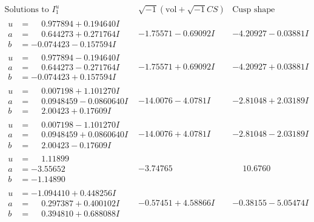 \documentclass[1p]{elsarticle_modified}
\theoremstyle{definition}
\newcommand{\I}{\sqrt{-1}}
\begin{document}
$$\begin{array}{c|c|c}  
\text{Solutions to }I^u_{1}& \I (\text{vol} + \sqrt{-1}CS) & \text{Cusp shape}\\
 \hline 
\begin{aligned}
u &= \phantom{-}0.977894 + 0.194640 I \\
a &= \phantom{-}0.644273 + 0.271764 I \\
b &= -0.074423 - 0.157594 I\end{aligned}
 & -1.75571 - 0.69092 I & -4.20927 - 0.03881 I \\ \hline\begin{aligned}
u &= \phantom{-}0.977894 - 0.194640 I \\
a &= \phantom{-}0.644273 - 0.271764 I \\
b &= -0.074423 + 0.157594 I\end{aligned}
 & -1.75571 + 0.69092 I & -4.20927 + 0.03881 I \\ \hline\begin{aligned}
u &= \phantom{-}0.007198 + 1.101270 I \\
a &= \phantom{-}0.0948459 - 0.0860640 I \\
b &= \phantom{-}2.00423 + 0.17609 I\end{aligned}
 & -14.0076 - 4.0781 I & -2.81048 + 2.03189 I \\ \hline\begin{aligned}
u &= \phantom{-}0.007198 - 1.101270 I \\
a &= \phantom{-}0.0948459 + 0.0860640 I \\
b &= \phantom{-}2.00423 - 0.17609 I\end{aligned}
 & -14.0076 + 4.0781 I & -2.81048 - 2.03189 I \\ \hline\begin{aligned}
u &= \phantom{-}1.11899\phantom{ +0.000000I} \\
a &= -3.55652\phantom{ +0.000000I} \\
b &= -1.14890\phantom{ +0.000000I}\end{aligned}
 & -3.74765\phantom{ +0.000000I} & \phantom{-}10.6760\phantom{ +0.000000I} \\ \hline\begin{aligned}
u &= -1.094410 + 0.448256 I \\
a &= \phantom{-}0.297387 + 0.400102 I \\
b &= \phantom{-}0.394810 + 0.688088 I\end{aligned}
 & -0.57451 + 4.58866 I & -0.38155 - 5.05474 I \\ \hline\begin{aligned}

\end{aligned}
\end{array}$$
\end{document}
